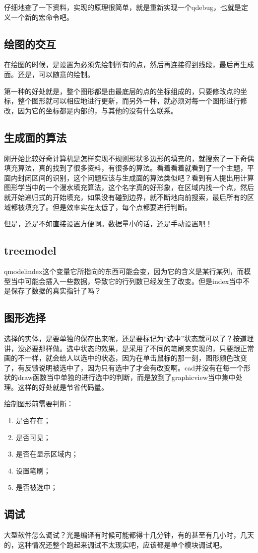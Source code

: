 仔细地查了一下资料，实现的原理很简单，就是重新实现一个qdebug，也就是定义一个新的宏命令吧。
\subsection{绘图的交互}
在绘图的时候，是设置为必须先绘制所有的点，然后再连接得到线段，最后再生成面。还是，可以随意的绘制。

第一种的好处就是，整个图形都是由最底层的点的坐标组成的，只要修改点的坐标，整个图形就可以相应地进行更新，而另外一种，就必须对每一个图形进行修改，因为它的坐标都是内部的，与其他的没有什么联系。
\subsection{生成面的算法}
刚开始比较好奇计算机是怎样实现不规则形状多边形的填充的，就搜索了一下奇偶填充算法，真的找到了很多资料，有很多的算法。看着看着就看到了一个主题，平面内封闭区间的识别，这个问题应该与生成面的算法类似吧？看到有人提出用计算图形学当中的一个漫水填充算法，这个名字真的好形象，在区域内找一个点，然后就开始递归式的开始填充，如果没有碰到边界，就不断地向前搜索，最后所有的区域都被填充了。但是效率实在太低了，每个点都要进行判断。

但是，还是不如直接设置方便啊。数据量小的话，还是手动设置吧！
\subsection{treemodel}
qmodelindex这个变量它所指向的东西可能会变，因为它的含义是某行某列，而模型当中可能会插入一些数据，导致它的行列数已经发生了改变。但是index当中不是保存了数据的真实指针了吗？
\subsection{图形选择}
选择的实体，是要单独的保存出来呢，还是要标记为“选中”状态就可以了？按道理讲，没必要那样做。选中状态的效果，是采用了不同的笔刷来实现的，只要跟正常画的不一样，就会给人以选中的状态，因为在单击鼠标的那一刻，图形颜色改变了，有反馈说明被选中了，因为只有选中了才会有改变啊。cad并没有在每一个形状的draw函数当中单独的进行选中的判断，而是放到了graphicview当中集中处理。这样的好处就是节省代码量。

绘制图形前需要判断：
\begin{enumerate}
	\item 是否存在；
	\item 是否可见；
	\item 是否在显示区域内；
	\item 设置笔刷；
	\item 是否被选中；
\end{enumerate}
\subsection{调试}
大型软件怎么调试？光是编译有时候可能都得十几分钟，有的甚至有几小时，几天的，这种情况还整个跑起来调试不太现实吧，应该都是单个模块调试吧。